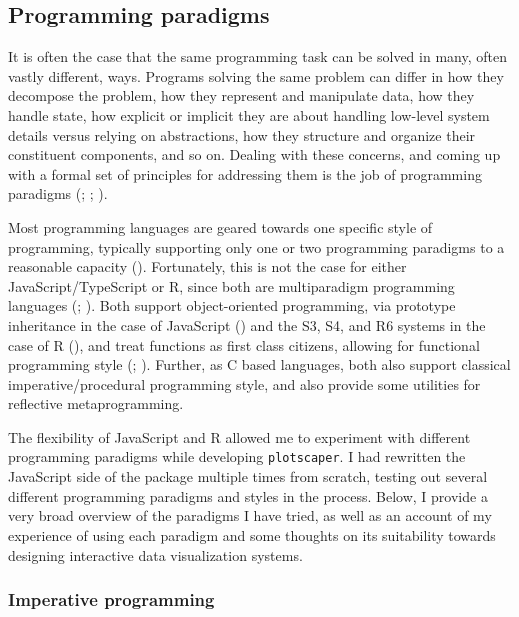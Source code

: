 \documentclass[
]{book}
\theoremstyle{definition}
\theoremstyle{definition}
\theoremstyle{definition}
\theoremstyle{definition}
\theoremstyle{remark}
\begin{document}
\subsection{Programming paradigms}\label{programming-paradigms}

It is often the case that the same programming task can be solved in many, often vastly different, ways. Programs solving the same problem can differ in how they decompose the problem, how they represent and manipulate data, how they handle state, how explicit or implicit they are about handling low-level system details versus relying on abstractions, how they structure and organize their constituent components, and so on. Dealing with these concerns, and coming up with a formal set of principles for addressing them is the job of programming paradigms (; ; ).

Most programming languages are geared towards one specific style of programming, typically supporting only one or two programming paradigms to a reasonable capacity (). Fortunately, this is not the case for either JavaScript/TypeScript or R, since both are multiparadigm programming languages (; ). Both support object-oriented programming, via prototype inheritance in the case of JavaScript () and the S3, S4, and R6 systems in the case of R (), and treat functions as first class citizens, allowing for functional programming style (; ). Further, as C based languages, both also support classical imperative/procedural programming style, and also provide some utilities for reflective metaprogramming.

The flexibility of JavaScript and R allowed me to experiment with different programming paradigms while developing \texttt{plotscaper}. I had rewritten the JavaScript side of the package multiple times from scratch, testing out several different programming paradigms and styles in the process. Below, I provide a very broad overview of the paradigms I have tried, as well as an account of my experience of using each paradigm and some thoughts on its suitability towards designing interactive data visualization systems.

\subsubsection{Imperative programming}\label{imperative-programming}
\end{document}

